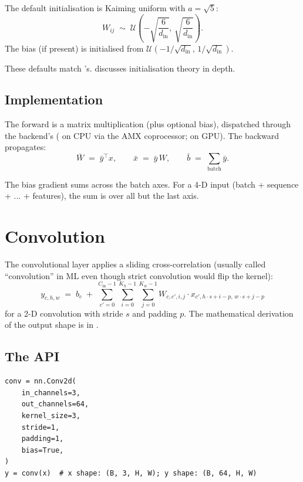 The default initialisation is Kaiming uniform with $a = \sqrt{5}$:
\[
W_{ij} \;\sim\; \mathcal{U}\!\left(-\sqrt{\frac{6}{d_{\text{in}}}},\, \sqrt{\frac{6}{d_{\text{in}}}}\right).
\]
The bias (if present) is initialised from
$\mathcal{U}(-1/\sqrt{d_{\text{in}}},\, 1/\sqrt{d_{\text{in}}})$.

These defaults match 's. 
discusses initialisation theory in depth.

\subsection{Implementation}
\label{ssec:linear_conv_norm:linear_impl}

The forward is a matrix multiplication (plus optional bias),
dispatched through the backend's  (
on CPU via the AMX coprocessor;  on GPU).
The backward propagates:
\[
\bar{W} \;=\; \bar{y}^\top x,
\qquad
\bar{x} \;=\; \bar{y}\, W,
\qquad
\bar{b} \;=\; \sum_{\text{batch}} \bar{y}.
\]

The bias gradient sums across the batch axes. For a 4-D input
(batch + sequence + ... + features), the sum is over all but the
last axis.

\section{Convolution}
\label{sec:linear_conv_norm:conv}

The convolutional layer applies a sliding cross-correlation
(usually called ``convolution'' in ML even though strict
convolution would flip the kernel):
\[
y_{c, h, w} \;=\; b_c \;+\; \sum_{c'=0}^{C_{\text{in}}-1}
\sum_{i=0}^{K_h-1} \sum_{j=0}^{K_w-1}
W_{c, c', i, j} \cdot x_{c', h \cdot s + i - p,\, w \cdot s + j - p}
\]
for a 2-D convolution with stride $s$ and padding $p$. The
mathematical derivation of the output shape is in
\cite{dumoulin_guide_2016}.

\subsection{The API}
\label{ssec:linear_conv_norm:conv_api}

\begin{lstlisting}[style=lucid,language=LucidPython]
conv = nn.Conv2d(
    in_channels=3,
    out_channels=64,
    kernel_size=3,
    stride=1,
    padding=1,
    bias=True,
)
y = conv(x)  # x shape: (B, 3, H, W); y shape: (B, 64, H, W)
\end{lstlisting}

